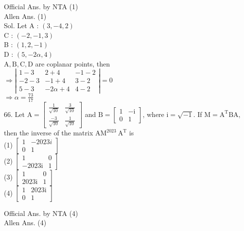 \documentclass[10pt]{article}
\begin{document}
Official Ans. by NTA (1)\\
Allen Ans. (1)\\
Sol. Let A : \((3,-4,2)\)\\
C : \((-2,-1,3)\)\\
B : \((1,2,-1)\)\\
D : \((5,-2 \alpha, 4)\)\\
\(\mathrm{A}, \mathrm{B}, \mathrm{C}, \mathrm{D}\) are coplanar points, then\\
\(\Rightarrow\left|\begin{array}{ccc}1-3 & 2+4 & -1-2 \\ -2-3 & -1+4 & 3-2 \\ 5-3 & -2 \alpha+4 & 4-2\end{array}\right|=0\)\\
\(\Rightarrow \alpha=\frac{73}{17}\)\\
66. Let \(\mathrm{A}=\left[\begin{array}{cc}\frac{1}{\sqrt{10}} & \frac{3}{\sqrt{10}} \\ \frac{-3}{\sqrt{10}} & \frac{1}{\sqrt{10}}\end{array}\right]\) and \(\mathrm{B}=\left[\begin{array}{cr}1 & -\mathrm{i} \\ 0 & 1\end{array}\right]\), where \(\mathrm{i}=\sqrt{-1}\). If \(\mathrm{M}=\mathrm{A}^{\mathrm{T}} \mathrm{BA}\), then the inverse of the matrix \(\mathrm{AM}^{2023} \mathrm{~A}^{\mathrm{T}}\) is\\
(1) \(\left[\begin{array}{cc}1 & -2023 i \\ 0 & 1\end{array}\right]\)\\
(2) \(\left[\begin{array}{ll}1 & 0 \\ -2023 \mathrm{i} & 1\end{array}\right]\)\\
(3) \(\left[\begin{array}{ll}1 & 0 \\ 2023 \mathrm{i} & 1\end{array}\right]\)\\
(4) \(\left[\begin{array}{cc}1 & 2023 \mathrm{i} \\ 0 & 1\end{array}\right]\)

Official Ans. by NTA (4)\\
Allen Ans. (4)
\end{document}
